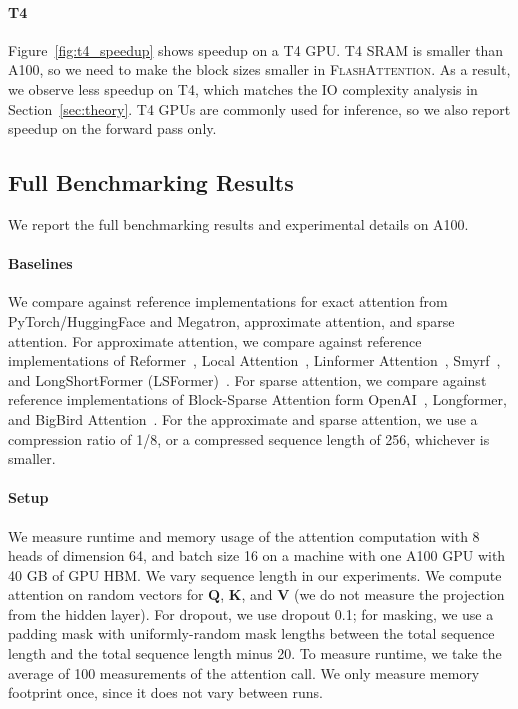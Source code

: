 \documentclass{article}
\newcommand{\vQ}{\mathbf{Q}}
\newcommand{\vK}{\mathbf{K}}
\newcommand{\vV}{\mathbf{V}}
\newcommand{\sysname}{\textsc{FlashAttention}\xspace}
\begin{document}
\paragraph{T4}
Figure~\ref{fig:t4_speedup} shows speedup on a T4 GPU. T4 SRAM is smaller than A100, so we need to make the block sizes smaller in \sysname.
As a result, we observe less speedup on T4, which matches the IO complexity analysis in Section~\ref{sec:theory}.
T4 GPUs are commonly used for inference, so we also report speedup on the forward pass only.

\subsection{Full Benchmarking Results}
\label{supp:benchmarking}

We report the full benchmarking results and experimental details on A100.

\paragraph{Baselines}
We compare against reference implementations for exact attention from PyTorch/HuggingFace and Megatron, approximate attention, and sparse attention.
For approximate attention, we compare against reference implementations of Reformer~\citep{kitaev2020reformer}, Local Attention~\citep{rae-razavi-2020-transformers}, Linformer Attention~\citep{wang2020linformer}, Smyrf~\citep{daras2020smyrf}, and LongShortFormer (LSFormer)~\citep{zhu2021long}.
For sparse attention, we compare against reference implementations of Block-Sparse Attention form OpenAI~\citep{child2019generating}, Longformer\citep{beltagy2020longformer}, and BigBird Attention~\citep{zaheer2020bigbird}.
For the approximate and sparse attention, we use a compression ratio of 1/8, or a compressed sequence length of 256, whichever is smaller.

\paragraph{Setup}
We measure runtime and memory usage of the attention computation with 8 heads of dimension 64, and batch size 16 on a machine with one A100 GPU with 40 GB of GPU HBM.
We vary sequence length in our experiments.
We compute attention on random vectors for $\vQ$, $\vK$, and $\vV$ (we do not measure the projection from the hidden layer).
For dropout, we use dropout 0.1; for masking, we use a padding mask with uniformly-random mask lengths between the total sequence length and the total sequence length minus 20.
To measure runtime, we take the average of 100 measurements of the attention call.
We only measure memory footprint once, since it does not vary between runs.
\end{document}
